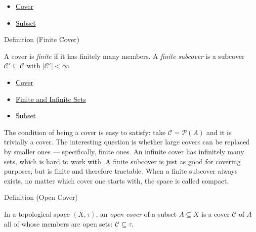 \begin{dependencies}
\begin{itemize}
  \item \hyperref[def:cover-full]{Cover}
  \item \hyperref[def:subset]{Subset}
\end{itemize}
\end{dependencies}

\begin{definitionbox}{Definition (Finite Cover)}
\begin{definition}\label{def:finite-cover}
A cover is \emph{finite} if it has finitely many members. A \emph{finite
subcover} is a subcover $\mathcal{C}' \subseteq \mathcal{C}$ with
$|\mathcal{C}'| < \infty$.
\end{definition}
\end{definitionbox}

\begin{dependencies}
\begin{itemize}
  \item \hyperref[def:cover-full]{Cover}
  \item \hyperref[def:finite-infinite]{Finite and Infinite Sets}
  \item \hyperref[def:subset]{Subset}
\end{itemize}
\end{dependencies}

\begin{remark*}
The condition of being a cover is easy to satisfy: take $\mathcal{C} =
\mathcal{P}(A)$ and it is trivially a cover. The interesting question is
whether large covers can be replaced by smaller ones — specifically, finite
ones. An infinite cover has infinitely many sets, which is hard to work with.
A finite subcover is just as good for covering purposes, but is finite and
therefore tractable. When a finite subcover always exists, no matter which
cover one starts with, the space is called compact.
\end{remark*}

\begin{definitionbox}{Definition (Open Cover)}
\begin{definition}\label{def:open-cover}
In a topological space $(X, \tau)$, an \emph{open cover} of a subset $A
\subseteq X$ is a cover $\mathcal{C}$ of $A$ all of whose members are open
sets: $\mathcal{C} \subseteq \tau$.
\end{definition}
\end{definitionbox}

